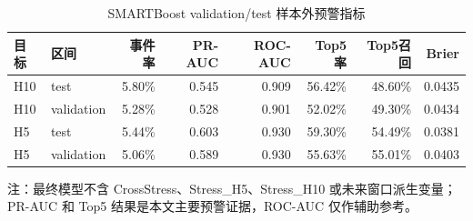\begin{table}[H]
\centering
\caption{SMARTBoost validation/test 样本外预警指标}
\label{tab:smartboost-metrics}
\scriptsize
\setlength{\tabcolsep}{3.8pt}
\begin{threeparttable}
\begin{tabular}{llrrrrrr}
\toprule
目标 & 区间 & 事件率 & PR-AUC & ROC-AUC & Top5率 & Top5召回 & Brier \\
\midrule
H10 & test & 5.80\% & 0.545 & 0.909 & 56.42\% & 48.60\% & 0.0435 \\
H10 & validation & 5.28\% & 0.528 & 0.901 & 52.02\% & 49.30\% & 0.0434 \\
H5 & test & 5.44\% & 0.603 & 0.930 & 59.30\% & 54.49\% & 0.0381 \\
H5 & validation & 5.06\% & 0.589 & 0.930 & 55.63\% & 55.01\% & 0.0403 \\
\bottomrule
\end{tabular}
\begin{tablenotes}[flushleft]
\footnotesize
\item 注：最终模型不含 CrossStress、Stress\_H5、Stress\_H10 或未来窗口派生变量；PR-AUC 和 Top5 结果是本文主要预警证据，ROC-AUC 仅作辅助参考。
\end{tablenotes}
\end{threeparttable}
\end{table}
